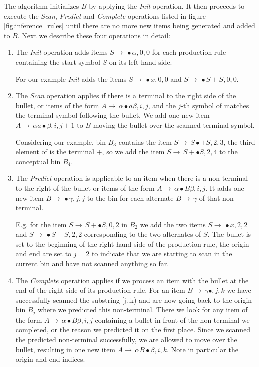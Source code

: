 \begin{isabellebody}
\begin{isamarkuptext}
The algorithm initializes $B$ by applying the \textit{Init} operation. It then proceeds to execute
the \textit{Scan}, \textit{Predict} and \textit{Complete} operations listed in figure \ref{fig:inference_rules}
until there are no more new items being generated and added to $B$. Next we describe these four operations
in detail:

\begin{enumerate}
  \item The \textit{Init} operation adds items
    $S \rightarrow \, \bullet\alpha, 0, 0$ for each production rule containing the start symbol $S$ on its left-hand side.

    For our example \textit{Init} adds the items $S \rightarrow \, \bullet x, 0, 0$ and $S \rightarrow \, \bullet S + S, 0 , 0$.
  \item The \textit{Scan} operation applies if there is a terminal to the right side of the bullet, or items of the form $A \rightarrow \, \alpha \bullet a \beta, i, j$,
    and the $j$-th symbol of \isa{{\isasymomega}} matches the terminal symbol following the bullet. We add one new item $A \rightarrow \, \alpha a \bullet \beta, i, j+1$
    to $B$ moving the bullet over the scanned terminal symbol.

    Considering our example, bin $B_3$ contains
    the item $S \rightarrow \, S \bullet + S, 2, 3$, the third element of \isa{{\isasymomega}} is the terminal $+$, so we add the
    item $S \rightarrow \, S + \bullet S, 2, 4$ to the conceptual bin $B_4$.
  \item The \textit{Predict} operation is applicable to an item when there is a non-terminal to the right of
    the bullet or items of the form $A \rightarrow \, \alpha \bullet B \beta, i, j$. It adds one new item $B \rightarrow \, \bullet \gamma, j, j$
    to the bin for each alternate $B \rightarrow \, \gamma$ of that non-terminal.

    E.g. for the item  $S \rightarrow \, S + \bullet S, 0, 2$ in $B_2$
    we add the two items $S \rightarrow \, \bullet x, 2, 2$ and $S \rightarrow \, \bullet S + S, 2, 2$ corresponding
    to the two alternates of $S$. The bullet is set to the beginning of the right-hand side of the production
    rule, the origin and end are set to $j = 2$ to indicate that we are starting to scan in the current bin and
    have not scanned anything so far.
  \item The \textit{Complete} operation applies if we process an item with the bullet at the end of the
    right side of its production rule. For an item $B \rightarrow \, \gamma \bullet, j, k$ we have successfully scanned the substring
    \omega[j..k) and are now going back to the origin bin $B_j$ where we predicted this non-terminal. There we look for any item of the form
    $A \rightarrow \, \alpha \bullet B \beta, i, j$ containing a bullet in front of the non-terminal we completed, or the reason we
    predicted it on the first place. Since we scanned the predicted non-terminal successfully, we are allowed to
    move over the bullet, resulting in one new item $A \rightarrow \, \alpha B \bullet \beta, i, k$. Note in particular
    the origin and end indices.


\end{enumerate}
\end{isamarkuptext}
\end{isabellebody}
